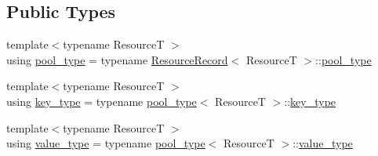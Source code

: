 \subsection*{Public Types}
\begin{DoxyCompactItemize}
\item 
{\footnotesize template$<$typename ResourceT $>$ }\\using \mbox{\hyperlink{classmage_1_1rendering_1_1_resource_manager_ab21a4e280087032ee533f267bd9bf602}{pool\+\_\+type}} = typename \mbox{\hyperlink{structmage_1_1rendering_1_1_resource_manager_1_1_resource_record}{Resource\+Record}}$<$ ResourceT $>$\+::\mbox{\hyperlink{classmage_1_1rendering_1_1_resource_manager_ab21a4e280087032ee533f267bd9bf602}{pool\+\_\+type}}
\item 
{\footnotesize template$<$typename ResourceT $>$ }\\using \mbox{\hyperlink{classmage_1_1rendering_1_1_resource_manager_a097b505b275b411e02c73d1899e91a44}{key\+\_\+type}} = typename \mbox{\hyperlink{classmage_1_1rendering_1_1_resource_manager_ab21a4e280087032ee533f267bd9bf602}{pool\+\_\+type}}$<$ ResourceT $>$\+::\mbox{\hyperlink{classmage_1_1rendering_1_1_resource_manager_a097b505b275b411e02c73d1899e91a44}{key\+\_\+type}}
\item 
{\footnotesize template$<$typename ResourceT $>$ }\\using \mbox{\hyperlink{classmage_1_1rendering_1_1_resource_manager_abb6ad8fd8054364a230839110c42174f}{value\+\_\+type}} = typename \mbox{\hyperlink{classmage_1_1rendering_1_1_resource_manager_ab21a4e280087032ee533f267bd9bf602}{pool\+\_\+type}}$<$ ResourceT $>$\+::\mbox{\hyperlink{classmage_1_1rendering_1_1_resource_manager_abb6ad8fd8054364a230839110c42174f}{value\+\_\+type}}
\end{DoxyCompactItemize}
